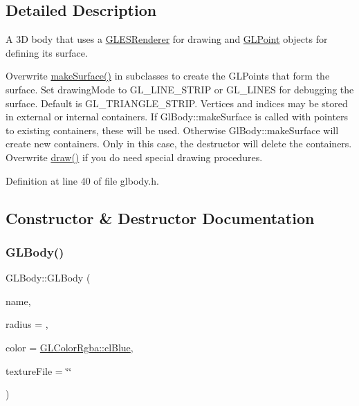 \subsection{Detailed Description}
A 3D body that uses a \mbox{\hyperlink{class_g_l_e_s_renderer}{G\+L\+E\+S\+Renderer}} for drawing and \mbox{\hyperlink{class_g_l_point}{G\+L\+Point}} objects for defining its surface. 

Overwrite \mbox{\hyperlink{class_g_l_body_a73e51b159f343d0bda87f50df382b7db}{make\+Surface()}} in subclasses to create the G\+L\+Points that form the surface. Set drawing\+Mode to G\+L\+\_\+\+L\+I\+N\+E\+\_\+\+S\+T\+R\+IP or G\+L\+\_\+\+L\+I\+N\+ES for debugging the surface. Default is G\+L\+\_\+\+T\+R\+I\+A\+N\+G\+L\+E\+\_\+\+S\+T\+R\+IP. Vertices and indices may be stored in external or internal containers. If Gl\+Body\+::make\+Surface is called with pointers to existing containers, these will be used. Otherwise Gl\+Body\+::make\+Surface will create new containers. Only in this case, the destructor will delete the containers. Overwrite \mbox{\hyperlink{class_g_l_body_aaeb47c0a8cfc36caed81fc139c42ddfc}{draw()}} if you do need special drawing procedures. 

Definition at line 40 of file glbody.\+h.



\subsection{Constructor \& Destructor Documentation}
\mbox{\label{class_g_l_body_a86dd61f116bfd01d8f4d8656cfe1ddc9}} 
\subsubsection{\texorpdfstring{GLBody()}{GLBody()}\hspace{0.1cm}{\footnotesize\ttfamily [1/2]}}
{\footnotesize\ttfamily G\+L\+Body\+::\+G\+L\+Body (\begin{DoxyParamCaption}\item[{const Q\+String \&}]{name,  }\item[{float}]{radius = {},  }\item[{const \mbox{\hyperlink{class_g_l_color_rgba}{G\+L\+Color\+Rgba}} \&}]{color = {\ttfamily \mbox{\hyperlink{class_g_l_color_rgba_abf246bb4f542851d17ba84b5143a9214}{G\+L\+Color\+Rgba\+::cl\+Blue}}},  }\item[{const Q\+String}]{texture\+File = {\ttfamily \char`\"{}\char`\"{}} }\end{DoxyParamCaption})}

